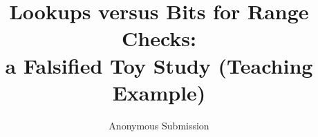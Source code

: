 \documentclass[runningheads]{llncs}   %
\newif\ifanon   \anontrue    %
\begin{document}
\title{Lookups versus Bits for Range Checks:\\ a Falsified Toy Study (Teaching Example)}
\ifanon
  \author{Anonymous Submission}
  \institute{}
\else
\fi
\maketitle




\ifanon\else
\subsubsection*{Acknowledgements.} None (teaching example).
\fi



\appendix

\end{document}
